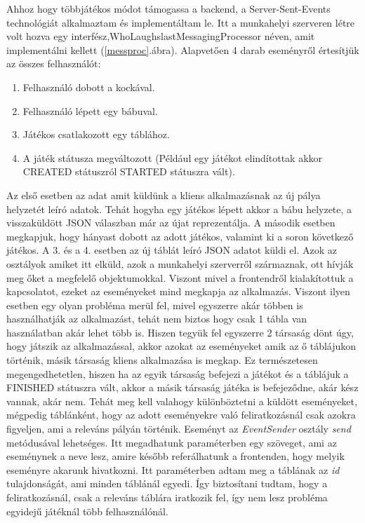 \documentclass[a4paper,twoside]{article}
\begin{document}
Ahhoz hogy többjátékos módot támogassa a backend, a Server-Sent-Events technológiát alkalmaztam és implementáltam le. Itt a munkahelyi szerveren létre volt hozva egy interfész,WhoLaughslastMessagingProcessor néven, amit implementálni kellett (\ref{messproc}.ábra). Alapvetően 4 darab eseményről értesítjük az összes felhasználót: \begin{enumerate}
	\item Felhasználó dobott a kockával.
	\item Felhasználó lépett egy bábuval.
	\item Játékos csatlakozott egy táblához.
	\item A játék státusza megváltozott (Például egy játékot elindítottak akkor CREATED státuszról STARTED státuszra vált).
\end{enumerate}
Az első esetben az adat amit küldünk a kliens alkalmazásnak az új pálya helyzetét leíró adatok. Tehát hogyha egy játékos lépett akkor a bábu helyzete, a visszaküldött JSON válaszban már az újat reprezentálja. A második esetben megkapjuk, hogy hányast dobott az adott játékos, valamint ki a soron következő játékos. A 3. és a 4. esetben az új táblát leíró JSON adatot küldi el. Azok az osztályok amiket itt elküld, azok a munkahelyi szerverről származnak, ott hívják meg őket a megfelelő objektumokkal. Viszont mivel a frontendről kialakítottuk a kapcsolatot, ezeket az eseményeket mind megkapja az alkalmazás. Viszont ilyen esetben egy olyan probléma merül fel, mivel egyszerre akár többen is használhatják az alkalmazást, tehát nem biztos hogy csak 1 tábla van használatban akár lehet több is. Hiszen tegyük fel egyszerre 2 társaság dönt úgy, hogy játszik az alkalmazással, akkor azokat az eseményeket amik az ő táblájukon történik, másik társaság kliens alkalmazása is megkap. Ez természetesen megengedhetetlen, hiszen ha az egyik társaság befejezi a játékot és a táblájuk a FINISHED státuszra vált, akkor a másik társaság játéka is befejeződne, akár kész vannak, akár nem. Tehát meg kell valahogy különböztetni a küldött eseményeket, mégpedig táblánként, hogy az adott eseményekre való feliratkozásnál csak azokra figyeljen, ami a releváns pályán történik. Eseményt az \textit{EventSender} osztály \textit{send} metódusával lehetséges. Itt megadhatunk paraméterben egy szöveget, ami az eseménynek a neve lesz, amire később referálhatunk a frontenden, hogy melyik eseményre akarunk hivatkozni. Itt paraméterben adtam meg a táblának az \textit{id} tulajdonságát, ami minden táblánál egyedi. Így biztosítani tudtam, hogy a feliratkozásnál, csak a releváns táblára iratkozik fel, így nem lesz probléma egyidejű játéknál több felhasználónál. 
\end{document}
